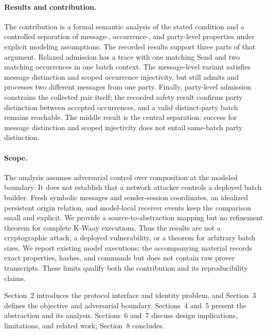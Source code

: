 \paragraph{Results and contribution.}
The contribution is a formal semantic analysis of the stated condition and a
controlled separation of message-, occurrence-, and party-level properties
under explicit modeling assumptions. The recorded results support three
parts of that argument. Relaxed admission has a trace with one matching Send
and two matching \receiveraccept occurrences in one batch context. The
message-level variant satisfies message distinction and scoped occurrence
injectivity, but still admits and processes two different messages from one
party. Finally, party-level admission constrains the collected pair itself;
the recorded safety result confirms party distinction between accepted
occurrences, and a valid distinct-party batch remains reachable. The middle
result is the central separation: success for message distinction and scoped
injectivity does not entail same-batch party distinction.

\paragraph{Scope.}
The analysis assumes adversarial control over composition at the modeled
boundary. It does not establish that a network attacker controls a deployed
batch builder. Fresh symbolic messages and sender-session coordinates, an
idealized persistent origin relation, and model-local receiver events keep
the comparison small and explicit. We provide a source-to-abstraction mapping
but no refinement theorem for complete K-Waay executions. Thus the results
are not a cryptographic attack, a deployed vulnerability, or a theorem for
arbitrary batch sizes. We report existing model executions; the accompanying
material records exact properties, hashes, and commands but does not contain
raw prover transcripts. These limits qualify both the contribution and its
reproducibility claims.

Section~2 introduces the protocol interface and identity problem, and
Section~3 defines the objective and adversarial boundary. Sections~4 and~5
present the abstraction and its analysis. Sections~6 and~7 discuss design
implications, limitations, and related work; Section~8 concludes.
